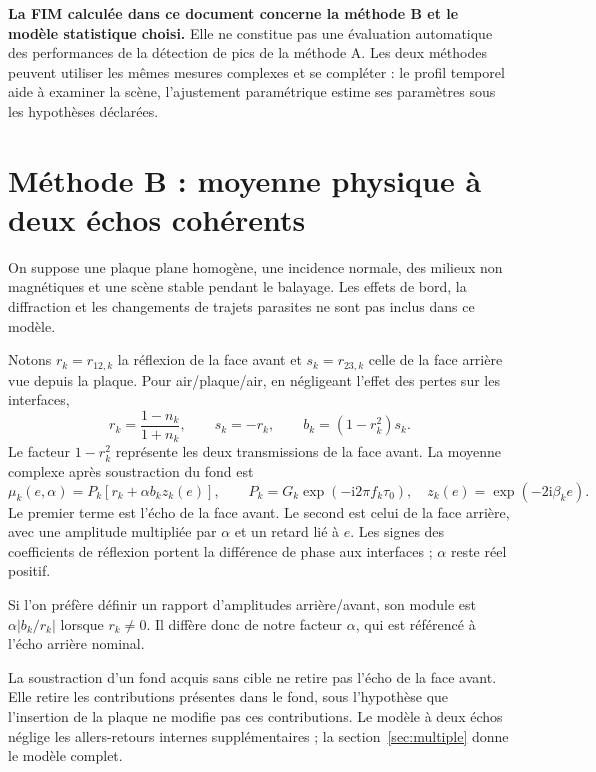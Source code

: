 \documentclass[11pt,a4paper]{article}
\newcommand{\ii}{\mathrm{i}}
\begin{document}
\textbf{La FIM calculée dans ce document concerne la méthode B et le modèle
statistique choisi.} Elle ne constitue pas une évaluation automatique des
performances de la détection de pics de la méthode A. Les deux méthodes
peuvent utiliser les mêmes mesures complexes et se compléter : le profil
temporel aide à examiner la scène, l'ajustement paramétrique estime ses
paramètres sous les hypothèses déclarées.

\section{Méthode B : moyenne physique à deux échos cohérents}\label{sec:modele}

On suppose une plaque plane homogène, une incidence normale, des milieux
non magnétiques et une scène stable pendant le balayage. Les effets de
bord, la diffraction et les changements de trajets parasites ne sont pas
inclus dans ce modèle.

Notons $r_k=r_{12,k}$ la réflexion de la face avant et $s_k=r_{23,k}$
celle de la face arrière vue depuis la plaque. Pour air/plaque/air,
en négligeant l'effet des pertes sur les interfaces,
\begin{equation}
 r_k=\frac{1-n_k}{1+n_k},\qquad s_k=-r_k,\qquad
 b_k=(1-r_k^2)s_k.
\end{equation}
Le facteur $1-r_k^2$ représente les deux transmissions de la face avant.
La moyenne complexe après soustraction du fond est
\begin{equation}\label{eq:mu}
 \boxed{\mu_k(e,\alpha)=P_k\left[r_k+\alpha b_kz_k(e)\right],\qquad
 P_k=G_k\exp(-\ii2\pi f_k\tau_0),\quad
 z_k(e)=\exp(-2\ii\beta_ke).}
\end{equation}
Le premier terme est l'écho de la face avant. Le second est celui de
la face arrière, avec une amplitude multipliée par $\alpha$ et un retard
lié à $e$. Les signes des coefficients de réflexion portent la différence
de phase aux interfaces ; $\alpha$ reste réel positif.

Si l'on préfère définir un rapport d'amplitudes arrière/avant, son module
est $\alpha|b_k/r_k|$ lorsque $r_k\ne0$. Il diffère donc de notre facteur
$\alpha$, qui est référencé à l'écho arrière nominal.

La soustraction d'un fond acquis sans cible ne retire pas l'écho de la
face avant. Elle retire les contributions présentes dans le fond, sous
l'hypothèse que l'insertion de la plaque ne modifie pas ces contributions.
Le modèle à deux échos néglige les allers-retours internes supplémentaires ;
la section~\ref{sec:multiple} donne le modèle complet.
\end{document}
